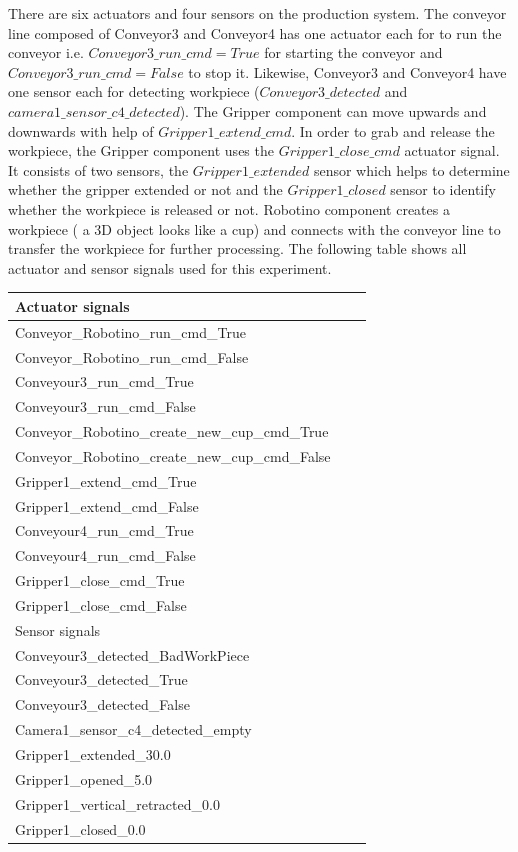 \documentclass[conference]{IEEEtran}
\begin{document}
There are six actuators and four sensors on the production system. The conveyor line composed of Conveyor3 and  Conveyor4  has  one actuator each for  to run the conveyor i.e. $Conveyor3\_run\_cmd = True$ for starting the conveyor  and $Conveyor3\_run\_cmd = False$ to stop it. Likewise,  Conveyor3 and  Conveyor4  have  one sensor each for  detecting workpiece ($ Conveyor3\_detected$ and $camera1\_sensor\_c4\_detected$). The Gripper component can move upwards and downwards with help of $Gripper1\_extend\_cmd$. In order to grab and release  the workpiece, the Gripper component uses the $Gripper1\_close\_cmd$ actuator signal. It consists of two sensors, the $Gripper1\_extended$ sensor  which helps to determine whether the gripper extended or not and the $Gripper1\_closed$ sensor to identify whether the workpiece is released or not. Robotino component creates a workpiece ( a 3D object looks like a cup) and connects with the conveyor line to transfer the workpiece for further processing. The following table shows all actuator and sensor signals used for this experiment.

\hfill

\begin{tabularx} {0.45\textwidth} { 
   | >{\raggedright\arraybackslash}X 
  | >{\centering\arraybackslash}X 
  | >{\raggedleft\arraybackslash}X | }
 \hline
 
 Actuator signals  \\
 \hline

Conveyor\_Robotino\_run\_cmd\_True \\
Conveyor\_Robotino\_run\_cmd\_False \\
Conveyour3\_run\_cmd\_True \\
Conveyour3\_run\_cmd\_False \\
Conveyor\_Robotino\_create\_new\_cup\_cmd\_True \\
Conveyor\_Robotino\_create\_new\_cup\_cmd\_False \\
Gripper1\_extend\_cmd\_True \\
Gripper1\_extend\_cmd\_False \\
Conveyour4\_run\_cmd\_True \\
Conveyour4\_run\_cmd\_False \\
Gripper1\_close\_cmd\_True \\
Gripper1\_close\_cmd\_False \\

\hline
 Sensor signals  \\
\hline
Conveyour3\_detected\_BadWorkPiece \\
Conveyour3\_detected\_True \\
Conveyour3\_detected\_False \\
Camera1\_sensor\_c4\_detected\_empty \\
Gripper1\_extended\_30.0 \\
Gripper1\_opened\_5.0 \\
Gripper1\_vertical\_retracted\_0.0 \\
Gripper1\_closed\_0.0 \\
\hline


\end{tabularx}
\\
\end{document}
